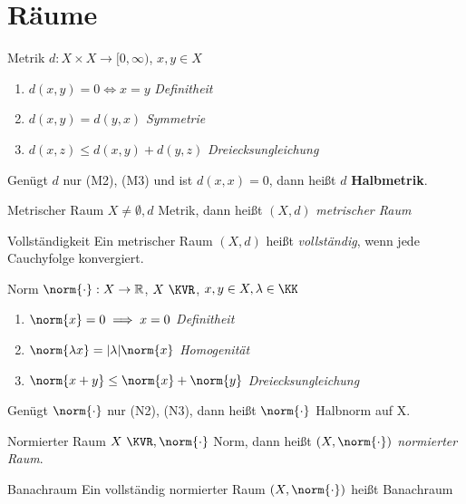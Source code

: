 
\section{Räume}
\begin{definition}{Metrik}
  $d:X \times X \to [0,\infty)$, $x,y \in X$
  \begin{enumerate}[label=(M\arabic*)]
    \item $d(x,y) = 0 \Leftrightarrow x = y$ \textit{Definitheit}
    \item $d(x,y) = d(y,x)$ \textit{Symmetrie}
    \item $d(x,z) \leq d(x,y) + d(y,z)$ \textit{Dreiecksungleichung}
  \end{enumerate}
\end{definition}

Genügt $d$ nur (M2), (M3) und ist $d(x,x) = 0$, dann heißt $d$
\textbf{Halbmetrik}.
\heel

\begin{definition}{Metrischer Raum}
  $X \neq \emptyset, d$ Metrik, dann heißt $(X,d)$ \textit{metrischer Raum}
\end{definition}

\begin{definition}{Vollständigkeit}
  Ein metrischer Raum $(X,d)$ heißt \textit{vollständig}, wenn jede Cauchyfolge
  konvergiert.
\end{definition}

\begin{definition}{Norm}
  $\norm{\cdot}:X\to\RR$, $X\ \KVR$, $x,y \in X, \lambda \in \KK$
  \begin{enumerate}[label=(N\arabic*)]
    \item $\norm{x} = 0 \implies x = 0$ \textit{Definitheit}
    \item $\norm{\lambda x} = |\lambda|\norm{x}$ \textit{Homogenität}
    \item $\norm{x+y} \leq \norm{x} + \norm{y}$ \textit{Dreiecksungleichung}
  \end{enumerate}
\end{definition}

Genügt $\norm{\cdot}$ nur (N2), (N3), dann heißt $\norm{\cdot}$
Halbnorm auf X.
\heel

\begin{definition}{Normierter Raum}
  $X\ \KVR, \norm{\cdot}$ Norm, dann heißt $(X,\norm{\cdot})$
  \textit{normierter Raum}.
\end{definition}

\begin{definition}{Banachraum}
  Ein vollständig normierter Raum ${(X,\norm{\cdot})}$ heißt Banachraum
\end{definition}
